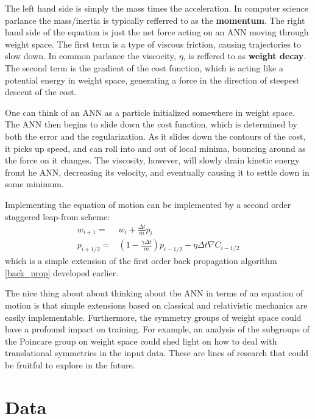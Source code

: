 \documentclass[prl,amsmath,amssymb,floatfix,superscriptaddress,notitlepage,twocolumn]{revtex4}
\newcommand{\ee}[1]{\begin{align} #1 \end{align}} 						%
\begin{document}
The left hand side is simply the mass times the acceleration. In computer science parlance the mass/inertia is typically refferred to as the \textbf{momentum}. The right hand side of the equation is just the net force acting on an ANN moving through weight space. The first term is a type of viscous friction, causing trajectories to slow down. In common parlance the viscocity, $\eta$, is reffered to as \textbf{weight decay}. The second term is the gradient of the cost function, which is acting like a potential energy in weight space, generating a force in the direction of steepest descent of the cost. 

One can think of an ANN as a particle initialized somewhere in weight space. The ANN then begins to slide down the cost function, which is determined by both the error and the regularization. As it slides down the contours of the cost, it picks up speed, and can roll into and out of local minima, bouncing around as the force on it changes. The viscosity, however, will slowly drain kinetic energy fromt he ANN, decreasing its velocity, and eventually causing it to settle down in some minimum. 

Implementing the equation of motion can be implemented by a second order staggered leap-from scheme:
\ee{
w_{i+1}=&w_i+\frac{\Delta t}{m}p_i\\
p_{i+1/2}=&(1-\frac{\gamma\Delta t}{m})p_{i-1/2}-\eta\Delta t \nabla C_{i-1/2}
}
which is a simple extension of the first order back propagation algorithm \ref{back_prop} developed earlier. 

The nice thing about about thinking about the ANN in terms of an equation of motion is that simple extensions based on classical and relativistic mechanics are easily implementable. Furthermore, the symmetry groups of weight space could have a profound impact on training. For example, an analysis of the subgroups of the Poincare group on weight space could shed light on how to deal with translational symmetries in the input data. These are lines of research that could be fruitful to explore in the future. 

\section{Data}
\end{document}
